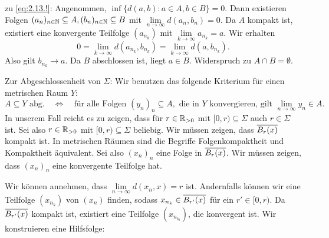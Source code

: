 \begin{beweis}[zu (i)]
\begin{description}
			zu \eqref{eq:2.13.!}: Angenommen, $\inf\{d(a,b) : a \in A, b \in B\} = 0$. Dann existieren Folgen $(a_n)_{n \in \mathbb{N}} \subseteq A, (b_n)_{n \in \mathbb{N}} \subseteq B$ mit $\lim\limits_{n \rightarrow \infty} d(a_n,b_n) = 0$.
			Da $A$ kompakt ist, existiert eine konvergente Teilfolge $(a_{n_k})$ mit $\lim\limits_{k \rightarrow \infty} a_{n_k} = a$.
			Wir erhalten
			\[
				0 = \lim\limits_{k \rightarrow \infty} d(a_{n_k},b_{n_k}) = \lim\limits_{k \rightarrow \infty} d(a,b_{n_k}).
			\]
			Also gilt $b_{n_k} \rightarrow a$.
			Da $B$ abschlossen ist, liegt $a \in B$. Widerspruch zu $A \cap B = \emptyset$.
		\end{description}
		Zur Abgeschlossenheit von $\Sigma$:
		Wir benutzen das folgende Kriterium für einen metrischen Raum $Y$:
		\[
			A \subseteq Y \text{ abg.} \quad \Leftrightarrow \quad \text{für alle Folgen } (y_n)_n \subseteq A, \text{ die in } Y \text{ konvergieren, gilt } \lim\limits_{n \rightarrow \infty} y_n \in A.
		\]
		In unserem Fall reicht es zu zeigen, dass für $r \in \mathbb{R}_{> 0}$ mit $[0,r) \subseteq \Sigma$ auch $r \in \Sigma$ ist.
		Sei also $r \in \mathbb{R}_{> 0}$ mit $[0,r) \subseteq \Sigma$ beliebig.
		Wir müssen zeigen, dass $\overline{B_r(x)}$ kompakt ist.
		In metrischen Räumen sind die Begriffe Folgenkompaktheit und Kompaktheit äquivalent.
		Sei also $(x_n)_n$ eine Folge in $\overline{B_r(x)}$.
		Wir müssen zeigen, dass $(x_n)_n$ eine konvergente Teilfolge hat.
		
		Wir können annehmen, dass $\lim\limits_{n \rightarrow \infty} d(x_n,x) = r$ ist. 
		Andernfalls können wir eine Teilfolge $(x_{n_k})$ von $(x_n)$ finden, sodass $x_{n_k} \in \overline{B_{r'}(x)}$ für ein $r' \in [0,r)$.
		Da $\overline{B_{r'}(x)}$ kompakt ist, existiert eine Teilfolge $(x_{n_{k_l}})$, die konvergent ist.
		Wir konstruieren eine Hilfsfolge:
		

\end{beweis}
